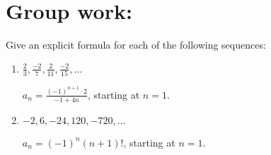 \documentclass[noinstructornotes]{ximera}
\begin{document}
\section{Group work:}










\begin{problem}
Give an explicit formula for each of the following sequences:
	\begin{enumerate}
	\item 	$\frac{2}{3}, \frac{-2}{7}, \frac{2}{11}, \frac{-2}{15}, \hdots$
	\begin{freeResponse}
	$a_n = \frac{(-1)^{n+1} \cdot 2}{-1 + 4n}$, starting at $n=1$.
	\end{freeResponse}
	
	
	
	\item 	$-2, 6,-24,120,-720, \hdots$
	\begin{freeResponse}
	$a_n = (-1)^n (n+1)!$, starting at $n=1$.
	\end{freeResponse}
	
	
	
	\end{enumerate}
		
\end{problem}

\begin{instructorNotes}

\end{instructorNotes}
\end{document}

